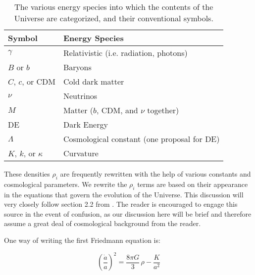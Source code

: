 
\begin{table}[htb]
\centering
\begin{tabular}{l|l}
\hline
Symbol & Energy Species \\ \hline
$\gamma$ & Relativistic (i.e. radiation, photons) \\
$B$ or $b$ & Baryons \\
$C$, $c$, or CDM & Cold dark matter \\
$\nu$ & Neutrinos \\
$M$ & Matter ($b$, CDM, and $\nu$ together) \\
DE & Dark Energy \\
$\Lambda$ & Cosmological constant (one proposal for DE) \\
$K$, $k$, or $\kappa$ & Curvature \\ \hline
\end{tabular}
 \caption[Energy species symbols]{The various energy species into which the 
 	contents of the Universe are categorized, and their conventional symbols.}
 \label{tab: species_symbols}
\end{table}


These densities $\rho_i$ are frequently rewritten with the help of various 
constants and cosmological parameters. We rewrite the $\rho_i$ terms are based 
on their appearance
in the equations that govern the evolution of the Universe. This discussion
will very closely follow section 2.2 from . The reader is
encouraged to engage this source in the event of confusion, as our discussion 
here will be brief and therefore assume a great deal of cosmological 
background from the reader.

One way of writing the first Friedmann equation is:


\begin{equation}
\label{eq: Friedmann1}
\left( \frac{\dot{a}}{a} \right)^2 = \frac{8 \pi G}{3} \, \rho - \frac{K}{a^2}
\end{equation}


